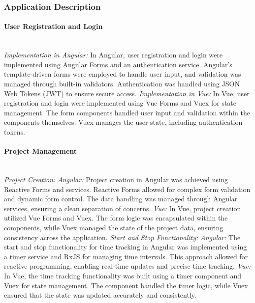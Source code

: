 \documentclass[conference]{IEEEtran}
\begin{document}
\subsubsection{Application Description}
\paragraph{User Registration and Login}
\textit{\\Implementation in Angular: }In Angular, user registration and login were implemented using Angular Forms and an authentication service. Angular's template-driven forms were employed to handle user input, and validation was managed through built-in validators. Authentication was handled using JSON Web Tokens (JWT) to ensure secure access.\newline
\textit{Implementation in Vue: }In Vue, user registration and login were implemented using Vue Forms and Vuex for state management. The form components handled user input and validation within the components themselves. Vuex manages the user state, including authentication tokens.
\newline
\paragraph{Project Management}
\textit{\\Project Creation:\newline}
\textit{Angular: }Project creation in Angular was achieved using Reactive Forms and services. Reactive Forms allowed for complex form validation and dynamic form control. The data handling was managed through Angular services, ensuring a clean separation of concerns.
\newline\textit{Vue: }In Vue, project creation utilized Vue Forms and Vuex. The form logic was encapsulated within the components, while Vuex managed the state of the project data, ensuring consistency across the application.
\newline\newline
\textit{Start and Stop Functionality:\newline}
\textit{Angular: }The start and stop functionality for time tracking in Angular was implemented using a timer service and RxJS for managing time intervals. This approach allowed for reactive programming, enabling real-time updates and precise time tracking.
\newline\textit{Vue: }In Vue, the time tracking functionality was built using a timer component and Vuex for state management. The component handled the timer logic, while Vuex ensured that the state was updated accurately and consistently.
\end{document}
